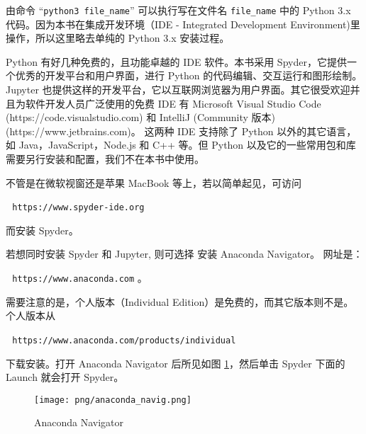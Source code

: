 \documentclass[main.tex]{subfiles}
\begin{document}
\noindent 由命令  “\texttt{python3 file\_name}”  可以执行写在文件名
\texttt{file\_name} 中的 Python 3.x 代码。因为本书在集成开发环境（IDE - Integrated Development Environment)里操作，所以这里略去单纯的 Python 3.x 安装过程。

Python 有好几种免费的，且功能卓越的 IDE 软件。本书采用 Spyder，它提供一个优秀的开发平台和用户界面，进行 Python 的代码编辑、交互运行和图形绘制。Jupyter 也提供这样的开发平台，它以互联网浏览器为用户界面。其它很受欢迎并且为软件开发人员广泛使用的免费 IDE 有 Microsoft Visual Studio Code (https://code.visualstudio.com) 和 IntelliJ (Community 版本) (https://www.jetbrains.com)。
这两种 IDE 支持除了 Python 以外的其它语言，如 Java，JavaScript，Node.js 和 C++ 等。但 Python 以及它的一些常用包和库需要另行安装和配置，我们不在本书中使用。  


不管是在微软视窗还是苹果 MacBook 等上，若以简单起见，可访问

\,\,\,\,\texttt{https://www.spyder-ide.org} 

\noindent 而安装 Spyder。

若想同时安装 Spyder 和 Jupyter, 则可选择 
安装 Anaconda Navigator。 网址是：

\,\,\,\,\texttt{https://www.anaconda.com} 。

\noindent 需要注意的是，个人版本（Individual Edition）是免费的，而其它版本则不是。个人版本从

\,\,\,\,\texttt{https://www.anaconda.com/products/individual} 

\noindent 下载安装。打开 Anaconda Navigator 后所见如图 \ref{fig:2.1.1}，然后单击 Spyder 下面的 Launch 就会打开 Spyder。

\begin{figure}[h]
	\texttt{[image: png/anaconda\_navig.png]}
	\caption{Anaconda Navigator}\label{fig:2.1.1}
\end{figure}
\end{document}
